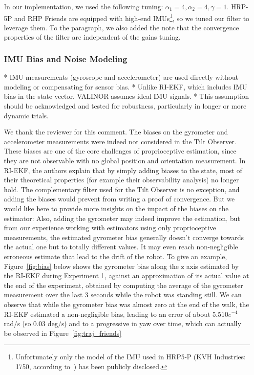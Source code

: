In our implementation, we used the following tuning: $\alpha_{1} = 4, \alpha_{2} = 4, \gamma = 1$. HRP-5P and RHP Friends are equipped with high-end IMUs\footnote{Unfortunately only the model of the IMU used in HRP5-P (KVH Industries: 1750, according to~\cite{Kaneko2019Hrp5}) has been publicly disclosed.}, so we tuned our filter to leverage them. 
To the paragraph, we also added the note that the convergence properties of the filter are independent of the gains tuning.

\subsubsection{IMU Bias and Noise Modeling}

\begin{revquote}
* IMU measurements (gyroscope and accelerometer) are used directly without modeling or compensating for sensor bias.
* Unlike RI-EKF, which includes IMU bias in the state vector, VALINOR assumes ideal IMU signals.
* This assumption should be acknowledged and tested for robustness, particularly in longer or more dynamic trials.
\end{revquote}

We thank the reviewer for this comment. The biases on the gyrometer and accelerometer measurements were indeed not considered in the Tilt Observer. These biases are one of the core challenges of proprioceptive estimation, since they are not observable with no global position and orientation measurement. In RI-EKF, the authors explain that by simply adding biases to the state, most of their theoretical properties (for example their observability analysis) no longer hold. The complementary filter used for the Tilt Observer is no exception, and adding the biases would prevent from writing a proof of convergence.
\alert{
But we would like here to provide more insights on the impact of the biases on the estimator:}
Also, adding the gyrometer may indeed improve the estimation, but from our experience working with estimators using only proprioceptive measurements, the estimated gyrometer bias generally doesn't converge towards the actual one but to totally different values. It may even reach non-negligible erroneous estimate that lead to the drift of the robot. To give an example, Figure~\ref{fig:bias} below shows the gyrometer bias along the z axis estimated by the RI-EKF during Experiment 1, against an approximation of its actual value at the end of the experiment, obtained by computing the average of the gyrometer measurement over the last 3 seconds while the robot was standing still. We can observe that while the gyrometer bias was almost zero at the end of the walk, the RI-EKF estimated a non-negligible bias, leading to an error of about $5.5 10e^{-4}$ rad/s (so 0.03 deg/s) and to a progressive in yaw over time, which can actually be observed in Figure~\ref{fig:traj_friends}

